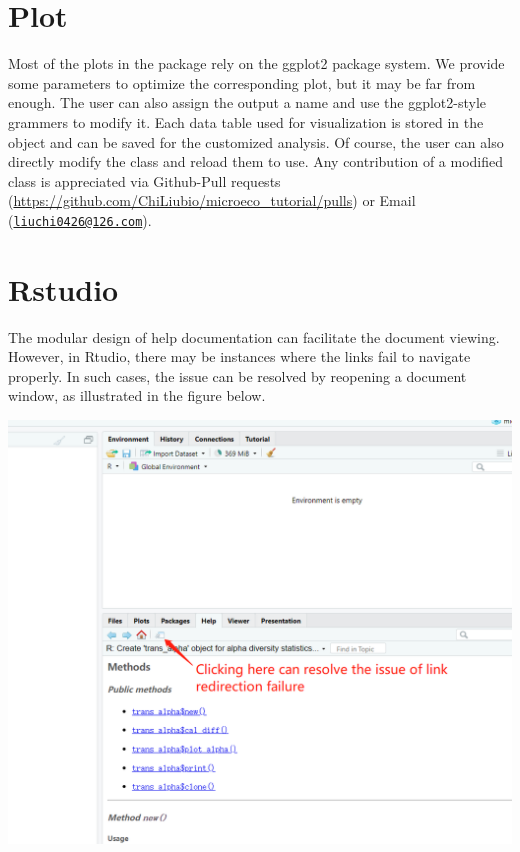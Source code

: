\documentclass[
]{book}
\begin{document}
\hypertarget{plot}{%
\section{Plot}\label{plot}}

Most of the plots in the package rely on the ggplot2 package system.
We provide some parameters to optimize the corresponding plot, but it may be far from enough.
The user can also assign the output a name and use the ggplot2-style grammers to modify it.
Each data table used for visualization is stored in the object and can be saved for the customized analysis.
Of course, the user can also directly modify the class and reload them to use.
Any contribution of a modified class is appreciated via Github-Pull requests (\url{https://github.com/ChiLiubio/microeco_tutorial/pulls}) or Email (\href{mailto:liuchi0426@126.com}{\nolinkurl{liuchi0426@126.com}}).

\hypertarget{rstudio}{%
\section{Rstudio}\label{rstudio}}

The modular design of help documentation can facilitate the document viewing.
However, in Rtudio, there may be instances where the links fail to navigate properly.
In such cases, the issue can be resolved by reopening a document window, as illustrated in the figure below.

\begin{center}\includegraphics[width=800px]{Images/Rstudio_link_redirection} \end{center}
\end{document}
